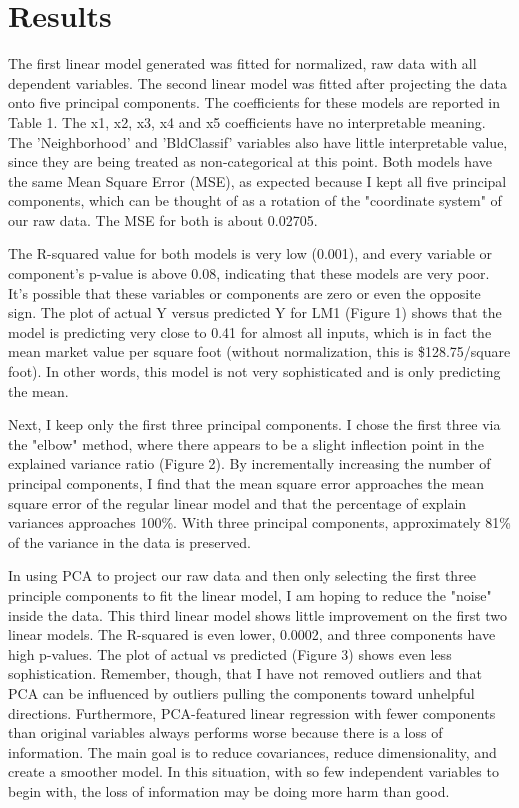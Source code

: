 \documentclass[10pt,twocolumn]{article}
\begin{document}
\section{Results}

The first linear model generated was fitted for normalized, raw data with all dependent
variables.  The second linear model was fitted after projecting the data onto
five principal components. The coefficients for these models are reported in
Table 1. The x1, x2, x3, x4 and x5 coefficients have no interpretable
meaning. The 'Neighborhood' and 'BldClassif' variables also have little
interpretable value, since they are being treated as non-categorical at this point.
Both models have the same Mean Square Error (MSE), as expected because I kept
all five principal components, which can be thought of as a rotation of
the "coordinate system" of our raw data. The MSE for both is about 0.02705.

The R-squared value for both models is very low (0.001), and every variable or component's
p-value is above 0.08, indicating that these models are very poor. It's possible that
these variables or components are zero or even the opposite sign. The plot of
actual Y versus predicted Y for LM1 (Figure 1) shows that the model is predicting
very close to 0.41 for almost all inputs, which is in fact the mean market value
per square foot (without normalization, this is \$128.75/square foot). In other words,
this model is not very sophisticated and is only predicting the mean.

Next, I keep only the first three principal components. I chose the first
three via the "elbow" method, where there appears to be a slight inflection point
in the explained variance ratio (Figure 2). By incrementally increasing the number
of principal components, I find that the mean square error approaches the mean
square error of the regular linear model and that the percentage of explain variances
approaches 100\%. With three principal components, approximately 81\% of the
variance in the data is preserved.

In using PCA to project our raw data and then only selecting the first three
principle components to fit the linear model, I am hoping to reduce the
"noise" inside the data. This third linear model shows little improvement
on the first two linear models. The R-squared is even lower, 0.0002, and three components
have high p-values. The plot of actual vs predicted (Figure 3) shows even less sophistication.
Remember, though, that I have not removed outliers and that PCA can be influenced by outliers
pulling the components toward unhelpful directions. Furthermore, PCA-featured
linear regression with fewer components than original variables always performs
worse because there is a loss of information. The main goal is to reduce covariances,
reduce dimensionality, and create a smoother model. In this situation, with so few
independent variables to begin with, the loss of information may be doing
more harm than good.
\end{document}
